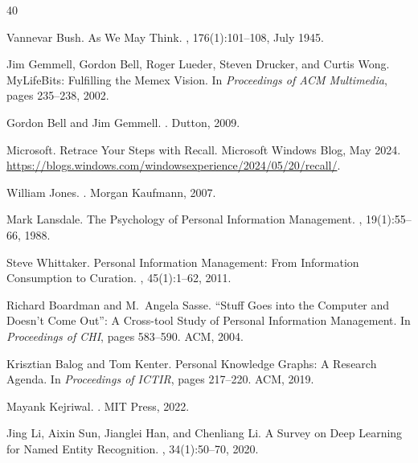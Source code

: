 \documentclass[manuscript,review]{acmart}
\begin{document}
\begin{thebibliography}{40}

Vannevar Bush.
\newblock As We May Think.
, 176(1):101--108, July 1945.

Jim Gemmell, Gordon Bell, Roger Lueder, Steven Drucker, and Curtis Wong.
\newblock MyLifeBits: Fulfilling the Memex Vision.
\newblock In {\em Proceedings of ACM Multimedia}, pages 235--238, 2002.

Gordon Bell and Jim Gemmell.
.
\newblock Dutton, 2009.

Microsoft.
\newblock Retrace Your Steps with Recall.
\newblock Microsoft Windows Blog, May 2024.
\newblock \url{https://blogs.windows.com/windowsexperience/2024/05/20/recall/}.

William Jones.
.
\newblock Morgan Kaufmann, 2007.

Mark Lansdale.
\newblock The Psychology of Personal Information Management.
, 19(1):55--66, 1988.

Steve Whittaker.
\newblock Personal Information Management: From Information Consumption to Curation.
, 45(1):1--62, 2011.

Richard Boardman and M.~Angela Sasse.
\newblock ``Stuff Goes into the Computer and Doesn't Come Out'': A Cross-tool Study of Personal Information Management.
\newblock In {\em Proceedings of CHI}, pages 583--590. ACM, 2004.

Krisztian Balog and Tom Kenter.
\newblock Personal Knowledge Graphs: A Research Agenda.
\newblock In {\em Proceedings of ICTIR}, pages 217--220. ACM, 2019.

Mayank Kejriwal.
.
\newblock MIT Press, 2022.

Jing Li, Aixin Sun, Jianglei Han, and Chenliang Li.
\newblock A Survey on Deep Learning for Named Entity Recognition.
, 34(1):50--70, 2020.


\end{thebibliography}
\end{document}
